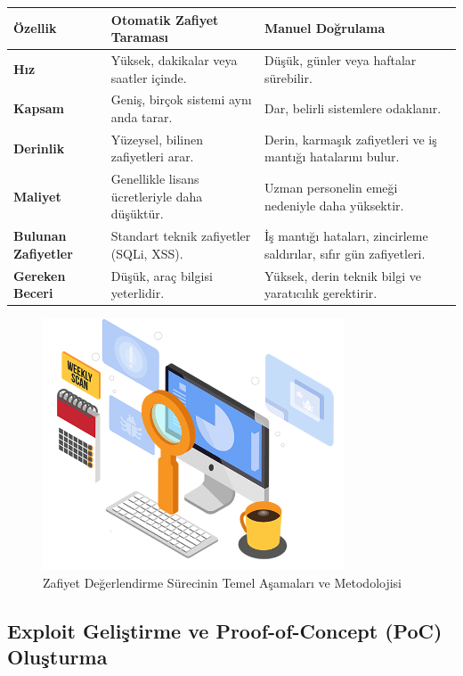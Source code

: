 \begin{tabular}{|l|l|l|}
\hline
\textbf{Özellik} & \textbf{Otomatik Zafiyet Taraması} & \textbf{Manuel Doğrulama} \\
\hline
\textbf{Hız} & Yüksek, dakikalar veya saatler içinde. & Düşük, günler veya haftalar sürebilir. \\
\hline
\textbf{Kapsam} & Geniş, birçok sistemi aynı anda tarar. & Dar, belirli sistemlere odaklanır. \\
\hline
\textbf{Derinlik} & Yüzeysel, bilinen zafiyetleri arar. & Derin, karmaşık zafiyetleri ve iş mantığı hatalarını bulur. \\
\hline
\textbf{Maliyet} & Genellikle lisans ücretleriyle daha düşüktür. & Uzman personelin emeği nedeniyle daha yüksektir. \\
\hline
\textbf{Bulunan Zafiyetler} & Standart teknik zafiyetler (SQLi, XSS). & İş mantığı hataları, zincirleme saldırılar, sıfır gün zafiyetleri. \\
\hline
\textbf{Gereken Beceri} & Düşük, araç bilgisi yeterlidir. & Yüksek, derin teknik bilgi ve yaratıcılık gerektirir. \\
\hline
\end{tabular}

\begin{figure}[H]
    \centering
    \includegraphics[width=0.8\textwidth]{img/vulnerability-assessment.png}
    \caption{Zafiyet Değerlendirme Sürecinin Temel Aşamaları ve Metodolojisi}
    \label{fig:vulnerability-assessment}
\end{figure}

\subsection{Exploit Geliştirme ve Proof-of-Concept (PoC) Oluşturma}

